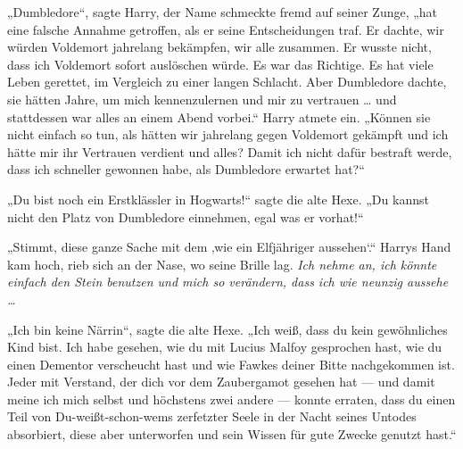 „Dumbledore“, sagte Harry, der Name schmeckte fremd auf seiner Zunge, „hat eine falsche Annahme getroffen, als er seine Entscheidungen traf. Er dachte, wir würden Voldemort jahrelang bekämpfen, wir alle zusammen. Er wusste nicht, dass ich Voldemort sofort auslöschen würde. Es war das Richtige. Es hat viele Leben gerettet, im Vergleich zu einer langen Schlacht. Aber Dumbledore dachte, sie hätten Jahre, um mich kennenzulernen und mir zu vertrauen … und stattdessen war alles an einem Abend vorbei.“
Harry atmete ein.
„Können sie nicht einfach so tun, als hätten wir jahrelang gegen Voldemort gekämpft und ich hätte mir ihr Vertrauen verdient und alles? Damit ich nicht dafür bestraft werde, dass ich schneller gewonnen habe, als Dumbledore erwartet hat?“

„Du bist noch ein Erstklässler in Hogwarts!“ sagte die alte Hexe.
„Du kannst nicht den Platz von Dumbledore einnehmen, egal was er vorhat!“

„Stimmt, diese ganze Sache mit dem ‚wie ein Elfjähriger aussehen‘.“
Harrys Hand kam hoch, rieb sich an der Nase, wo seine Brille lag.
\emph{Ich nehme an, ich könnte einfach den Stein benutzen und mich so verändern, dass ich wie neunzig aussehe …}

„Ich bin keine Närrin“, sagte die alte Hexe.
„Ich weiß, dass du kein gewöhnliches Kind bist. Ich habe gesehen, wie du mit Lucius Malfoy gesprochen hast, wie du einen Dementor verscheucht hast und wie Fawkes deiner Bitte nachgekommen ist. Jeder mit Verstand, der dich vor dem Zaubergamot gesehen hat — und damit meine ich mich selbst und höchstens zwei andere — konnte erraten, dass du einen Teil von Du-weißt-schon-wems zerfetzter Seele in der Nacht seines Untodes absorbiert, diese aber unterworfen und sein Wissen für gute Zwecke genutzt hast.“

